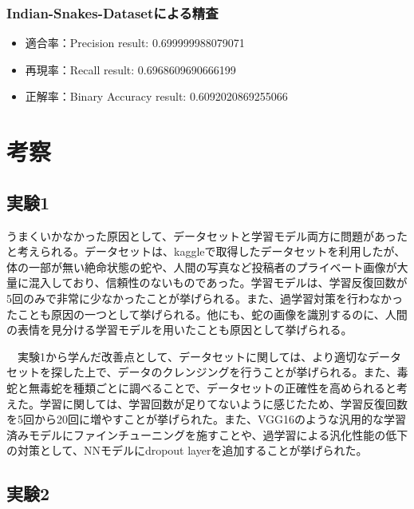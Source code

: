 \documentclass[a4paper, 11pt, titlepage]{jsarticle}
\begin{document}
\subsubsection{Indian-Snakes-Datasetによる精査}
\begin{itemize}
\item 適合率：Precision result: 0.699999988079071
\item 再現率：Recall result: 0.6968609690666199
\item 正解率：Binary Accuracy result: 0.6092020869255066
\end{itemize}

\section{考察}
\subsection{実験1}
うまくいかなかった原因として、データセットと学習モデル両方に問題があったと考えられる。データセットは、kaggleで取得したデータセットを利用したが、体の一部が無い絶命状態の蛇や、人間の写真など投稿者のプライベート画像が大量に混入しており、信頼性のないものであった。学習モデルは、学習反復回数が5回のみで非常に少なかったことが挙げられる。また、過学習対策を行わなかったことも原因の一つとして挙げられる。他にも、蛇の画像を識別するのに、人間の表情を見分ける学習モデルを用いたことも原因として挙げられる。\par
　実験1から学んだ改善点として、データセットに関しては、より適切なデータセットを探した上で、データのクレンジングを行うことが挙げられる。また、毒蛇と無毒蛇を種類ごとに調べることで、データセットの正確性を高められると考えた。学習に関しては、学習回数が足りてないように感じたため、学習反復回数を5回から20回に増やすことが挙げられた。また、VGG16のような汎用的な学習済みモデルにファインチューニングを施すことや、過学習による汎化性能の低下の対策として、NNモデルにdropout layerを追加することが挙げられた。

\subsection{実験2}


\clearpage
\end{document}
